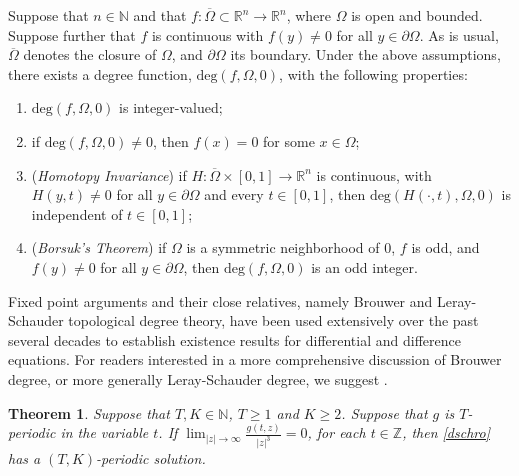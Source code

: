\documentclass[10pt,a4paper]{amsart}
\newcommand{\R}{\mathbb{R}}
\newcommand{\N}{\mathbb{N}}
\newcommand{\Z}{\mathbb{Z}}
\newcommand{\ov}{\overline}
\newcommand{\ben}{\begin{enumerate}}
\newcommand{\een}{\end{enumerate}}
\newcommand{\bdeg}{\text{deg}}
\numberwithin{equation}{section}
\newtheorem{theorem}{Theorem}[section]
\begin{document}
Suppose that $n\in \N$ and that $f:\ov{\Omega}\subset \R^n\to\R^n$, where $\Omega$ is open and bounded.  Suppose further that $f$ is continuous with $f(y)\neq 0$ for all $y\in \partial \Omega$.  As is usual, $\ov{\Omega}$ denotes the closure of $\Omega$, and $\partial \Omega$ its boundary. Under the above assumptions,  there exists a degree function, $\bdeg(f,\Omega, 0)$, with the following properties:
\ben
\item[(a)] $\bdeg(f,\Omega,0)$ is integer-valued;
\item[(b)] if $\bdeg(f,\Omega,0)\neq 0$, then $f(x)=0$ for some $x\in\Omega$;
\item[(c)] ({\em Homotopy Invariance})  if $H:\ov{\Omega}\times[0,1]\to\R^n$ is continuous, with $H(y,t)\neq0$ for all $y\in \partial \Omega$ and every $t\in[0,1]$, then $\bdeg(H(\cdot,t),\Omega,0)$ is independent of $t\in [0,1]$; 
\item[(d)] ({\em Borsuk's Theorem}) if $\Omega$ is a symmetric neighborhood of $0$, $f$ is odd, and $f(y)\neq 0$ for all $y\in \partial \Omega$,  then $\bdeg(f,\Omega, 0)$ is an odd integer. 
\een

Fixed point arguments and their close relatives, namely Brouwer and Leray-Schauder topological degree theory, have been used extensively over the past several decades to establish existence results for differential and difference equations. For readers interested in a more comprehensive discussion of Brouwer degree, or more generally Leray-Schauder degree, we suggest \cite{Deimling,Rouche}.




\begin{theorem}\label{dnlsperiodic}
Suppose that $T,K\in \N$, $T\geq 1$ and $K\geq 2$. Suppose that $g$ is $T$-periodic in the variable $t$.  If $\lim_{|z|\to \infty} \frac{g(t,z)}{|z|^3}=0$, for each $t\in \Z$, then \eqref{dschro} has a $(T,K)$-periodic solution.
\end{theorem}
\end{document}
